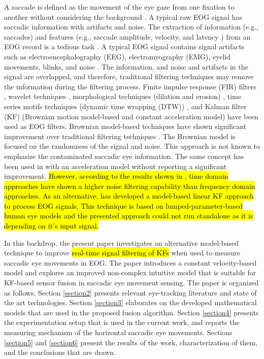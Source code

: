 \documentclass[transmag]{IEEEtran}
\begin{document}
A saccade is defined as the movement of the eye gaze from one fixation to another without considering the background \cite{ref33}. A typical raw EOG signal has saccadic information with artifacts and noise. The extraction of information (e.g., saccades) and features (e.g., saccade amplitude, velocity, and latency \cite{ref33}) from an EOG record  is a tedious task \cite{ref4} \cite{ref5}. A typical EOG signal contains signal artifacts such as electroencephalography (EEG), electromyography (EMG), eyelid movements, blinks, and noise \cite{ref27}. The information, and noise and artifacts in the signal are overlapped, and therefore, traditional filtering techniques may remove the information during the filtering process. Finite impulse response (FIR) filters \cite{ref27}, wavelet techniques \cite{ref6} \cite{ref8}, morphological techniques (dilation and erosion) \cite{ref9}, time series motifs techniques (dynamic time wrapping (DTW)) \cite{ref10}, and Kalman filter (KF) (Brownian motion model-based and constant acceleration model) have been used as EOG filters. Brownian model-based techniques have shown significant improvement over traditional filtering techniques \cite{ref5}. The Brownian model is focused on the randomness of the signal and noise. This approach is not known to emphasize the contaminated saccadic eye information. The same concept has been used in \cite{ref7} with an acceleration model without reporting a significant improvement. \hl{However, according to the results shown in {\cite{ref7}}, time domain approaches have shown a higher noise filtering capability than frequency domain approaches. As an alternative, {\cite{ref31}} has developed a model-based linear KF approach to process EOG signals. This technique is based on lumped-parameter-based human eye models and the presented approach could not run standalone as it is depending on it's input signal.} 

In this backdrop, the present paper investigates an alternative model-based technique to improve \hl{real-time signal filtering of KFs} when used to measure saccadic eye movements in EOG. The paper introduces a constant velocity-based model and explores an improved non-complex intuitive model that is suitable for KF-based sensor fusion in saccadic eye movement sensing. The paper is organized as follows. Section \ref{section2} presents relevant eye-tracking literature and state of the art technologies. Section \ref{section3} elaborates on the developed mathematical models that are used in the proposed fusion algorithm. Section \ref{section4} presents the experimentation setup that is used in the current work, and reports the measuring mechanism of the horizontal saccadic eye movements. Sections \ref{section5} and \ref{section6} present the results of the work, characterization of them, and the conclusions that are drawn. 
\end{document}
